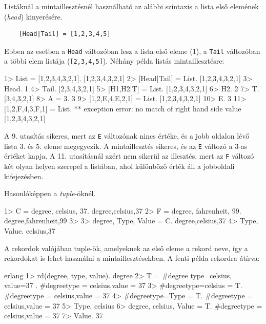 \documentclass[12pt, a4paper, oneside]{book}
\begin{document}
Listáknál a mintaillesztésnél használható az alábbi szintaxis a lista első
elemének (\emph{head}) kinyerésére.

\begin{verbatim}
    [Head|Tail] = [1,2,3,4,5]
\end{verbatim}

\noindent Ebben az esetben a \texttt{Head} változóban lesz a lista első eleme (1), a
\texttt{Tail} változóban a többi elem listája (\texttt{[2,3,4,5]}). Néhány
példa listás mintaillesztésre:

\begin{code}{}{}
1> List = [1,2,3,4,3,2,1].
[1,2,3,4,3,2,1]
2> [Head|Tail] = List.
[1,2,3,4,3,2,1]
3> Head.
1
4> Tail.
[2,3,4,3,2,1]
5> [H1,H2|T] = List.
[1,2,3,4,3,2,1]
6> H2.
2
7> T.
[3,4,3,2,1]
8> A = 3.
3
9> [1,2,E,4,E,2,1] = List. 
[1,2,3,4,3,2,1]
10> E.
3
11> [1,2,F,4,3,F,1] = List.
** exception error: no match of right hand 
side value [1,2,3,4,3,2,1]
\end{code}

\noindent A 9. utasítás sikeres, mert az \texttt{E} változónak nincs értéke, és
a jobb oldalon lévő lista 3. és 5. eleme megegyezik. A mintaillesztés sikeres,
és az \texttt{E} változó a 3-as értéket kapja. A 11. utasításnál azért nem
sikerül az illesztés, mert az \texttt{F} változó két olyan helyen szerepel a
listában, ahol különböző érték áll a jobboldali kifejezésben.

\noindent Hasonlóképpen a \emph{tuple}-öknél.

\begin{code}{}{}
1> C = {degree, celsius, 37}.
{degree,celsius,37}
2> F = {degree, fahrenheit, 99}.
{degree,fahrenheit,99}
3> 
3> {degree, Type, Value} = C.
{degree,celsius,37}
4> {Type, Value}.
{celsius,37}
\end{code}

\noindent A rekordok valójában tuple-ök, amelyeknek az első eleme a rekord
neve, így a rekordokat is lehet használni a mintaillesztésekben. A fenti példa
rekordra átírva:

\begin{code}{erlang}{}
1> rd(degree, { type, value}).
degree
2> T = #degree{ type=celsius, value=37 }.
#degree{type = celsius,value = 37}
3> #degree{type=celsius} = T.
#degree{type = celsius,value = 37}
4> #degree{type=Type} = T.   
#degree{type = celsius,value = 37}
5> Type.
celsius
6> {degree, celsius, Value} = T.
#degree{type = celsius,value = 37}
7> Value.
37
\end{code}
\end{document}
